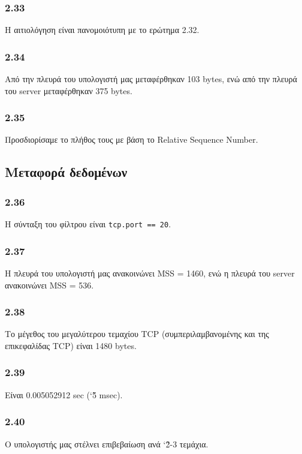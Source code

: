 		\subsubsection*{2.33} 
			Η αιτιολόγηση είναι πανομοιότυπη με το ερώτημα 2.32.
		
		\subsubsection*{2.34} 
			Από την πλευρά του υπολογιστή μας μεταφέρθηκαν 103 bytes, ενώ από την πλευρά του server μεταφέρθηκαν 375 bytes.
		
		\subsubsection*{2.35} 
			Προσδιορίσαμε το πλήθος τους με βάση το Relative Sequence Number.
		
		\subsection*{Μεταφορά δεδομένων}
		
		\subsubsection*{2.36}
			Η σύνταξη του φίλτρου είναι \verb|tcp.port == 20|.
		
		\subsubsection*{2.37} 
			Η πλευρά του υπολογιστή μας ανακοινώνει MSS = 1460, ενώ η πλευρά του server ανακοινώνει MSS = 536.
		
		\subsubsection*{2.38} 
			Το μέγεθος του μεγαλύτερου τεμαχίου TCP (συμπεριλαμβανομένης και της επικεφαλίδας TCP) είναι 1480 bytes.
		
		\subsubsection*{2.39} 
			Είναι 0.005052912 sec (\char`\~5 msec).
		
		\subsubsection*{2.40} 
			Ο υπολογιστής μας στέλνει επιβεβαίωση ανά \char`\~2-3 τεμάχια.
		
